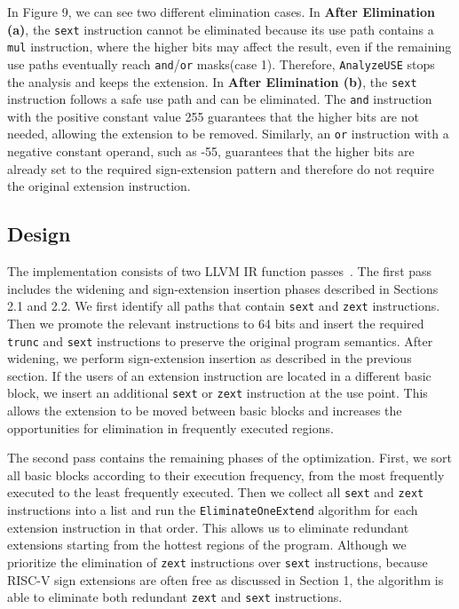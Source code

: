 

In Figure 9, we can see two different elimination cases. In \textbf{After Elimination (a)}, the \texttt{sext} instruction cannot be eliminated because its use path contains a \texttt{mul} instruction, where the higher bits may affect the result, even if the remaining use paths eventually reach \texttt{and}/\texttt{or} masks(case 1). Therefore, \texttt{AnalyzeUSE} stops the analysis and keeps the extension. In \textbf{After Elimination (b)}, the \texttt{sext} instruction follows a safe use path and can be eliminated. The \texttt{and} instruction with the positive constant value 255 guarantees that the higher bits are not needed, allowing the extension to be removed. Similarly, an \texttt{or} instruction with a negative constant operand, such as -55, guarantees that the higher bits are already set to the required sign-extension pattern and therefore do not require the original extension instruction.


\subsection{Design}

The implementation consists of two LLVM IR function passes~\cite{llvm-project,llvm-writing-pass}. The first pass includes the widening and sign-extension insertion phases described in Sections 2.1 and 2.2. We first identify all paths that contain \texttt{sext} and \texttt{zext} instructions. Then we promote the relevant instructions to 64 bits and insert the required \texttt{trunc} and \texttt{sext} instructions to preserve the original program semantics. After widening, we perform sign-extension insertion as described in the previous section. If the users of an extension instruction are located in a different basic block, we insert an additional \texttt{sext} or \texttt{zext} instruction at the use point. This allows the extension to be moved between basic blocks and increases the opportunities for elimination in frequently executed regions.

The second pass contains the remaining phases of the optimization. First, we sort all basic blocks according to their execution frequency, from the most frequently executed to the least frequently executed. Then we collect all \texttt{sext} and \texttt{zext} instructions into a list and run the \texttt{EliminateOneExtend} algorithm for each extension instruction in that order. This allows us to eliminate redundant extensions starting from the hottest regions of the program. Although we prioritize the elimination of \texttt{zext} instructions over \texttt{sext} instructions, because RISC-V sign extensions are often free as discussed in Section 1, the algorithm is able to eliminate both redundant \texttt{zext} and \texttt{sext} instructions.

